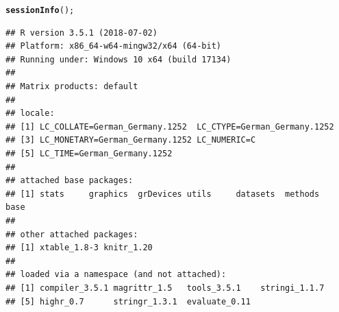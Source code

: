 \documentclass{article}\usepackage[]{graphicx}\usepackage[]{color}
\makeatletter
\newcommand{\hlstd}[1]{\textcolor[rgb]{0.345,0.345,0.345}{#1}}%
\newcommand{\hlkwd}[1]{\textcolor[rgb]{0.737,0.353,0.396}{\textbf{#1}}}%
\newenvironment{kframe}{%
 \def\at@end@of@kframe{}%
 \ifinner\ifhmode%
  \def\at@end@of@kframe{\end{minipage}}%
  \begin{minipage}{\columnwidth}%
 \fi\fi%
 \def\FrameCommand##1{\hskip\@totalleftmargin \hskip-\fboxsep
 \colorbox{shadecolor}{##1}\hskip-\fboxsep
     \hskip-\linewidth \hskip-\@totalleftmargin \hskip\columnwidth}%
 \MakeFramed {\advance\hsize-\width
   \@totalleftmargin\z@ \linewidth\hsize
   \@setminipage}}%
 {\par\unskip\endMakeFramed%
 \at@end@of@kframe}
\newenvironment{knitrout}{}{} %
\makeatother
\begin{document}
\begin{knitrout}
\color{fgcolor}\begin{kframe}
\begin{alltt}
\hlkwd{sessionInfo}\hlstd{();}
\end{alltt}
\begin{verbatim}
## R version 3.5.1 (2018-07-02)
## Platform: x86_64-w64-mingw32/x64 (64-bit)
## Running under: Windows 10 x64 (build 17134)
## 
## Matrix products: default
## 
## locale:
## [1] LC_COLLATE=German_Germany.1252  LC_CTYPE=German_Germany.1252   
## [3] LC_MONETARY=German_Germany.1252 LC_NUMERIC=C                   
## [5] LC_TIME=German_Germany.1252    
## 
## attached base packages:
## [1] stats     graphics  grDevices utils     datasets  methods   base     
## 
## other attached packages:
## [1] xtable_1.8-3 knitr_1.20  
## 
## loaded via a namespace (and not attached):
## [1] compiler_3.5.1 magrittr_1.5   tools_3.5.1    stringi_1.1.7 
## [5] highr_0.7      stringr_1.3.1  evaluate_0.11
\end{verbatim}
\end{kframe}
\end{knitrout}
\end{document}
